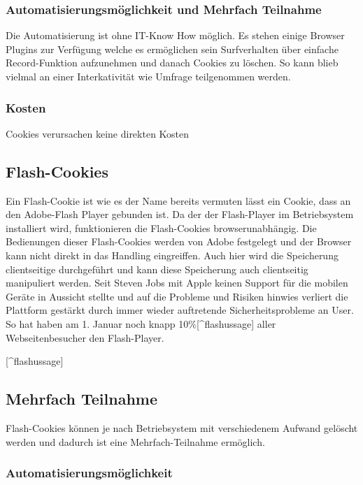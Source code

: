 \subsubsection{Automatisierungsmöglichkeit und Mehrfach
Teilnahme}\label{automatisierungsmuxf6glichkeit-und-mehrfach-teilnahme}

Die Automatisierung ist ohne IT-Know How möglich. Es stehen einige
Browser Plugins zur Verfügung welche es ermöglichen sein Surfverhalten
über einfache Record-Funktion aufzunehmen und danach Cookies zu löschen.
So kann blieb vielmal an einer Interkativität wie Umfrage teilgenommen
werden.

\subsubsection{Kosten}\label{kosten}

Cookies verursachen keine direkten Kosten

\subsection{Flash-Cookies}\label{flash-cookies}

Ein Flash-Cookie ist wie es der Name bereits vermuten lässt ein Cookie,
dass an den Adobe-Flash Player gebunden ist. Da der der Flash-Player im
Betriebsystem installiert wird, funktionieren die Flash-Cookies
browserunabhängig. Die Bedienungen dieser Flash-Cookies werden von Adobe
festgelegt und der Browser kann nicht direkt in das Handling
eingreiffen. Auch hier wird die Speicherung clientseitige durchgeführt
und kann diese Speicherung auch clientseitig manipuliert werden. Seit
Steven Jobs mit Apple keinen Support für die mobilen Geräte in Aussicht
stellte und auf die Probleme und Risiken hinwies verliert die Plattform
gestärkt durch immer wieder auftretende Sicherheitsprobleme an User. So
hat haben am 1. Januar noch knapp 10\%{[}\^{}flashussage{]} aller
Webseitenbesucher den Flash-Player.

{[}\^{}flashussage{]}\autocite{flashussage}

\subsection{Mehrfach Teilnahme}\label{mehrfach-teilnahme}

Flash-Cookies können je nach Betriebsystem mit verschiedenem Aufwand
gelöscht werden und dadurch ist eine Mehrfach-Teilnahme ermöglich.

\subsubsection{Automatisierungsmöglichkeit}\label{automatisierungsmuxf6glichkeit}


